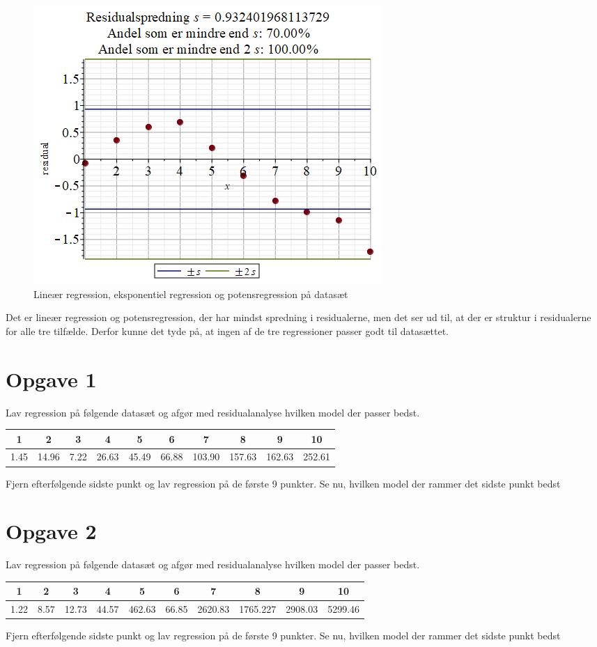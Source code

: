 \begin{exa}
\begin{figure}[H]
\includegraphics[width = \textwidth*4/10]{Billeder/residualpow.png}
\caption{Lineær regression, eksponentiel regression og potensregression på datasæt}
\label{fig:regression}
\end{figure}
Det er lineær regression og potensregression, der har mindst spredning i residualerne, men det ser ud til, at der er struktur i residualerne for alle tre tilfælde. Derfor kunne det tyde på, at ingen af de tre regressioner passer godt til datasættet.
\end{exa}
\section*{Opgave 1}

Lav regression på følgende datasæt og afgør med residualanalyse hvilken model der passer bedst.
\begin{center}
\begin{tabular}{c|c|c|c|c|c|c|c|c|c}
1 & 2 & 3 & 4 & 5 & 6 & 7 & 8 & 9 & 10\\ \hline
1.45 & 14.96 & 7.22 & 26.63 & 45.49 & 66.88 & 103.90&157.63 & 162.63 & 252.61
\end{tabular}
\end{center}
Fjern efterfølgende sidste punkt og lav regression på de første 9 punkter. Se nu, hvilken model der rammer det sidste punkt bedst


\section*{Opgave 2}
Lav regression på følgende datasæt og afgør med residualanalyse hvilken model der passer bedst.
\begin{center}
\begin{tabular}{c|c|c|c|c|c|c|c|c|c}
1 & 2 & 3 & 4 & 5 & 6 & 7 & 8 & 9 & 10\\ \hline
1.22& 8.57 &12.73& 44.57&
 462.63& 66.85& 2620.83 &1765.227
& 2908.03& 5299.46
\end{tabular}
\end{center}
Fjern efterfølgende sidste punkt og lav regression på de første 9 punkter. Se nu, hvilken model der rammer det sidste punkt bedst


